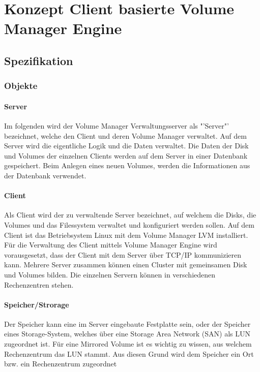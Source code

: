 \chapter{Konzept Client basierte Volume Manager Engine}
\label{cha:Konzept}

\section{Spezifikation}
\subsection{Objekte}
\subsubsection{Server}
Im folgenden wird der Volume Manager Verwaltungsserver als "'Server"' bezeichnet, welche den Client und deren Volume Manager verwaltet. Auf dem Server wird die eigentliche Logik und die Daten verwaltet. Die Daten der Disk und Volumes der einzelnen Clients werden auf dem Server in einer Datenbank gespeichert. Beim Anlegen eines neuen Volumes, werden die Informationen aus der Datenbank verwendet. 

\subsubsection{Client}
Als Client wird der zu verwaltende Server bezeichnet, auf welchem die Disks, die Volumes und das Filessystem verwaltet und konfiguriert werden sollen. Auf dem Client ist das Betriebsystem Linux mit dem Volume Manager LVM installiert. Für die Verwaltung des Client mittels Volume Manager Engine wird vorausgesetzt, dass der Client mit dem Server über TCP/IP kommunizieren kann. Mehrere Server zusammen können einen Cluster mit gemeinsamen Disk und Volumes bilden. Die einzelnen Servern können in verschiedenen Rechenzentren stehen.

\subsubsection{Speicher/Strorage}
Der Speicher kann eine im Server eingebaute Festplatte sein, oder der Speicher eines Storage-System, welches über eine Storage Area Network (\gls{SAN}) als LUN zugeordnet ist. Für eine Mirrored Volume ist es wichtig zu wissen, aus welchem Rechenzentrum das LUN stammt. Aus diesen Grund wird dem Speicher ein Ort bzw. ein Rechenzentrum zugeordnet

